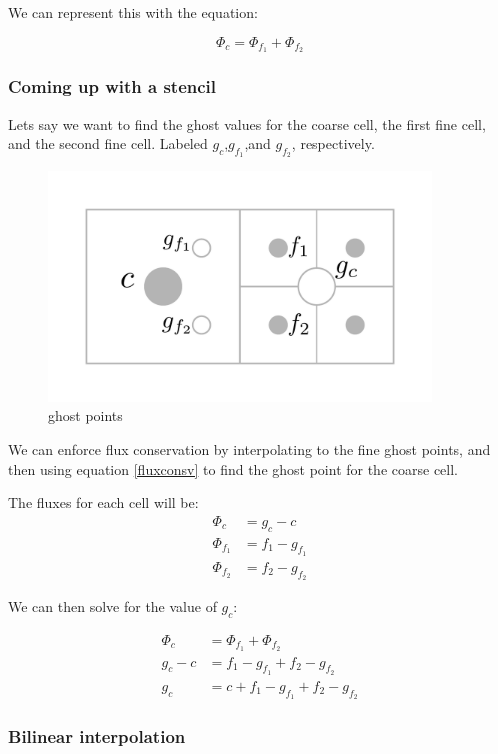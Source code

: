 \documentclass[12pt]{article}
\begin{document}
We can represent this with the equation:

\begin{equation}
    \Phi_{c}=\Phi_{f_1}+\Phi_{f_2}
    \label{fluxconsv}
\end{equation}

\subsubsection*{Coming up with a stencil}
Lets say we want to find the ghost values for the coarse cell, the first fine cell, and the second
fine cell. Labeled $g_c$,$g_{f_1}$,and $g_{f_2}$, respectively.

\begin{figure}[H]
    \centering
    \includegraphics[width=4in]{images/ghost.pdf}
    \caption{ghost points}
\end{figure}

We can enforce flux conservation by interpolating to the fine ghost points, and then using equation
\ref{fluxconsv} to find the ghost point for the coarse cell.

The fluxes for each cell will be:
\begin{align}
    \Phi_c&=g_c-c\\
    \Phi_{f_1}&=f_1-g_{f_1}\\
    \Phi_{f_2}&=f_2-g_{f_2}
\end{align}

We can then solve for the value of $g_c$:

\begin{align}
    \Phi_{c}&=\Phi_{f_1}+\Phi_{f_2}\\
    g_c-c   &=f_1-g_{f_1}+f_2-g_{f_2}\\
    g_c     &=c+f_1-g_{f_1}+f_2-g_{f_2}
    \label{ghostconsv}
\end{align}

\subsubsection*{Bilinear interpolation}
\end{document}
